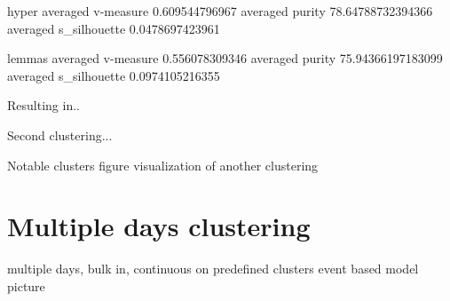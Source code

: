   hyper
  averaged v-measure 0.609544796967
  averaged purity 78.64788732394366
  averaged s_silhouette 0.0478697423961

  lemmas
  averaged v-measure 0.556078309346
  averaged purity 75.94366197183099
  averaged s_silhouette 0.0974105216355

  Resulting in..

  Second clustering...

    Notable clusters figure
    visualization of another clustering

\section{Multiple days clustering}
  
  multiple days, bulk in,
  continuous on predefined clusters
  event based model picture

